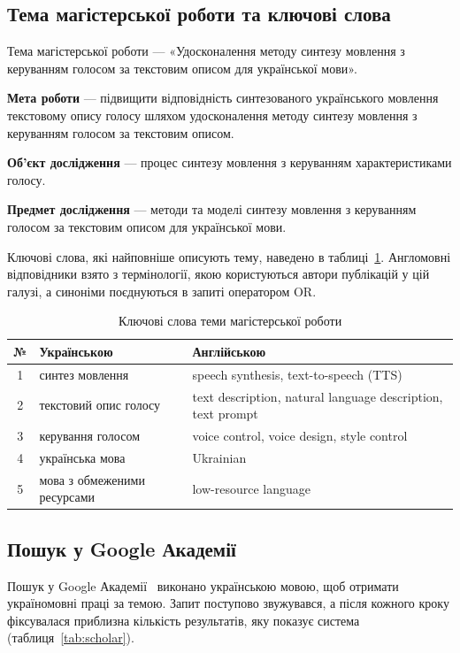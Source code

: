 \documentclass[14pt,a4paper]{extreport}
\begin{document}
\subsection{Тема магістерської роботи та ключові слова}

Тема магістерської роботи — «Удосконалення методу синтезу мовлення з керуванням голосом за текстовим описом для української мови».

\textbf{Мета роботи} — підвищити відповідність синтезованого українського мовлення текстовому опису голосу шляхом удосконалення методу синтезу мовлення з керуванням голосом за текстовим описом.

\textbf{Об'єкт дослідження} — процес синтезу мовлення з керуванням характеристиками голосу.

\textbf{Предмет дослідження} — методи та моделі синтезу мовлення з керуванням голосом за текстовим описом для української мови.

Ключові слова, які найповніше описують тему, наведено в таблиці~\ref{tab:keywords}. Англомовні відповідники взято з термінології, якою користуються автори публікацій у цій галузі, а синоніми поєднуються в запиті оператором OR.

\begin{table}[H]
\caption{Ключові слова теми магістерської роботи}
\label{tab:keywords}
\small
\begin{tabularx}{\linewidth}{|c|X|X|}
\hline
\textbf{№} & \textbf{Українською} & \textbf{Англійською} \\
\hline
1 & синтез мовлення & speech synthesis, text-to-speech (TTS) \\
\hline
2 & текстовий опис голосу & text description, natural language description, text prompt \\
\hline
3 & керування голосом & voice control, voice design, style control \\
\hline
4 & українська мова & Ukrainian \\
\hline
5 & мова з обмеженими ресурсами & low-resource language \\
\hline
\end{tabularx}
\end{table}

\subsection{Пошук у Google Академії}

Пошук у Google Академії~\cite{scholar} виконано українською мовою, щоб отримати україномовні праці за темою. Запит поступово звужувався, а після кожного кроку фіксувалася приблизна кількість результатів, яку показує система (таблиця~\ref{tab:scholar}).
\end{document}
